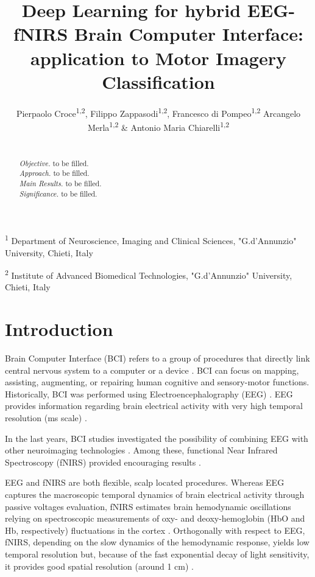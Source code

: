 \documentclass[12pt ]{iopart}
\begin{document}
\title[DNN for EEG-fNIRS BCI]{Deep Learning for  hybrid EEG-fNIRS Brain Computer Interface: application to Motor Imagery Classification}

\author{Pierpaolo Croce\textsuperscript{1,2}, Filippo Zappasodi\textsuperscript{1,2}, Francesco di Pompeo\textsuperscript{1,2} Arcangelo Merla\textsuperscript{1,2} \& Antonio Maria Chiarelli\textsuperscript{1,2}}

\vspace{10pt}
\begin{indented}
\item[] \textsuperscript{1} Department of Neuroscience, Imaging and Clinical Sciences, "G.d’Annunzio" University, Chieti, Italy
\item[] \textsuperscript{2} Institute of Advanced Biomedical Technologies, "G.d’Annunzio" University, Chieti, Italy
\end{indented}

\begin{abstract}
	\\
	\textit{Objective.} to be filled. \\
	\textit{Approach.} to be filled.\\
	\textit{Main Results.} to be filled. \\
	\textit{Significance.} to be filled.
\end{abstract}


\section{Introduction}

Brain Computer Interface (BCI) refers to a group of procedures that directly link  central nervous system to a computer or a device \parencite{lotte2007review}. BCI can focus on mapping, assisting, augmenting, or repairing human cognitive and sensory-motor functions. 
Historically, BCI was performed using Electroencephalography (EEG) \parencite{wolpaw2000brain}. EEG  provides information regarding brain electrical activity with very high temporal resolution (ms scale) \parencite{hallez2007review}. 

In the last years, BCI studies investigated the possibility of combining EEG with other neuroimaging technologies \parencite{amiri2013review}. Among these, functional Near Infrared Spectroscopy (fNIRS) provided encouraging results \parencite{hennrich2015investigating} .

EEG and fNIRS are both flexible, scalp located procedures. Whereas EEG captures the macroscopic temporal dynamics of brain electrical activity through passive voltages evaluation, fNIRS estimates brain hemodynamic oscillations  relying on spectroscopic measurements of oxy- and deoxy-hemoglobin (HbO and Hb, respectively) fluctuations in the cortex \parencite{boas2014twenty, villringer1997non}. Orthogonally with respect to EEG, fNIRS, depending on the slow dynamics of the hemodynamic response, yields low temporal resolution but, because of the fast exponential decay of light sensitivity, it provides good spatial resolution (around 1 cm) \parencite{chiarelli2016combining}. 
\end{document}
